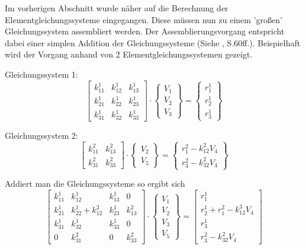
Im vorherigen Abschnitt wurde näher auf die Berechnung der Elementgleichungssysteme eingegangen. Diese müssen nun zu einem 'großen' Gleichungssystem assembliert werden. Der Assemblierungsvorgang entspricht dabei einer simplen Addition der Gleichungssysteme (Siehe \cite{SMS_VO_skript}, S.60ff.). Beispielhaft wird der Vorgang anhand von 2 Elementgleichungssystemen gezeigt.\newline

Gleichungssystem 1:
\begin{equation}
\begin{bmatrix}
k_{11}^1 & k_{12}^1 & k_{13}^1 \\
k_{21}^1 & k_{22}^1 & k_{23}^1 \\
k_{31}^1 & k_{32}^1 & k_{33}^1
\end{bmatrix} \cdot
\begin{Bmatrix}
V_1\\
V_2\\
V_3
\end{Bmatrix} =
\begin{Bmatrix}
r_1^1\\
r_2^1\\
r_3^1
\end{Bmatrix}
\end{equation}


Gleichungssystem 2:
\begin{equation}
\begin{bmatrix}
k_{11}^2 & k_{13}^2 \\
k_{31}^2 & k_{33}^2
\end{bmatrix} \cdot
\begin{Bmatrix}
V_2\\
V_5
\end{Bmatrix} =
\begin{Bmatrix}
r_1^2 - k_{12}^2 V_4\\
r_3^2 - k_{32}^2 V_4
\end{Bmatrix}
\end{equation}

Addiert man die Gleichungssysteme so ergibt sich
\begin{equation}
\begin{bmatrix}
	k_{11}^1 & k_{12}^1 & k_{13}^1 & 0 \\
	k_{21}^1 & k_{22}^1 + k_{12}^2 & k_{23}^1 & k_{13}^2 \\
	k_{31}^1 & k_{32}^1 & k_{33}^1 & 0\\
	0 & k_{31}^2 & 0 & k_{33}^2
\end{bmatrix} \cdot
\begin{Bmatrix}
V_1\\
V_2\\
V_3\\
V_5
\end{Bmatrix} = 
\begin{bmatrix}
r_1^1\\
r_2^1 +r_1^2 - k_{12}^3 V_4\\
r_3^1\\
r_3^2 - k_{32}^2 V_4

\end{bmatrix}
\end{equation}

